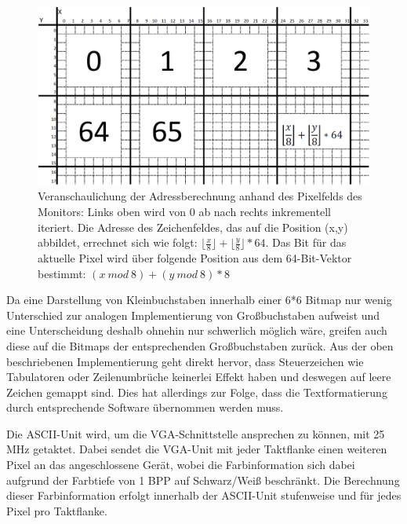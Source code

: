 \begin{figure}[H]
	\centering
		\includegraphics[width=1.0\textwidth]{Bildschirm.png}
	\caption[Veranschaulichung der Adressberechnung der ASCII-Unit]{Veranschaulichung der Adressberechnung anhand des Pixelfelds des Monitors: Links oben wird von 0 ab nach rechts inkrementell iteriert. Die Adresse des Zeichenfeldes, das auf die Position (x,y) abbildet, errechnet sich wie folgt: $\lfloor \frac{x}{8} \rfloor + \lfloor \frac{y}{8} \rfloor * 64$. Das Bit f\"ur das aktuelle Pixel wird \"uber folgende Position aus dem 64-Bit-Vektor bestimmt: $(x\:  mod\:  8) + (y\:  mod\:  8) * 8$}
\end{figure}

Da eine Darstellung von Kleinbuchstaben innerhalb einer 6*6 Bitmap nur wenig Unterschied zur analogen Implementierung von Gro\ss{}buchstaben aufweist und eine Unterscheidung deshalb ohnehin nur schwerlich m\"oglich w\"are, greifen auch diese auf die Bitmaps der entsprechenden Gro\ss{}buchstaben zur\"uck. Aus der oben beschriebenen Implementierung geht direkt hervor, dass Steuerzeichen wie Tabulatoren oder Zeilenumbr\"uche keinerlei Effekt haben und deswegen auf leere Zeichen gemappt sind. Dies hat allerdings zur Folge, dass die Textformatierung durch entsprechende Software \"ubernommen werden muss.

Die ASCII-Unit wird, um die VGA-Schnittstelle ansprechen zu k\"onnen, mit 25 MHz getaktet. Dabei sendet die VGA-Unit mit jeder Taktflanke einen weiteren Pixel an das angeschlossene Ger\"at, wobei die Farbinformation sich dabei aufgrund der Farbtiefe von 1 BPP auf Schwarz/Wei\ss{} beschr\"ankt. Die Berechnung dieser Farbinformation erfolgt innerhalb der ASCII-Unit stufenweise und f\"ur jedes Pixel pro Taktflanke. 

